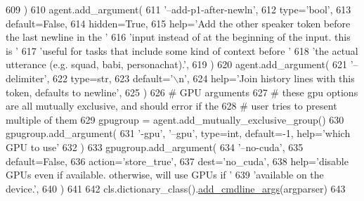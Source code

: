 \begin{DoxyCode}
609         )
610         agent.add\_argument(
611             \textcolor{stringliteral}{'--add-p1-after-newln'},
612             type=\textcolor{stringliteral}{'bool'},
613             default=\textcolor{keyword}{False},
614             hidden=\textcolor{keyword}{True},
615             help=\textcolor{stringliteral}{'Add the other speaker token before the last newline in the '}
616             \textcolor{stringliteral}{'input instead of at the beginning of the input. this is '}
617             \textcolor{stringliteral}{'useful for tasks that include some kind of context before '}
618             \textcolor{stringliteral}{'the actual utterance (e.g. squad, babi, personachat).'},
619         )
620         agent.add\_argument(
621             \textcolor{stringliteral}{'--delimiter'},
622             type=str,
623             default=\textcolor{stringliteral}{'\(\backslash\)n'},
624             help=\textcolor{stringliteral}{'Join history lines with this token, defaults to newline'},
625         )
626         \textcolor{comment}{# GPU arguments}
627         \textcolor{comment}{# these gpu options are all mutually exclusive, and should error if the}
628         \textcolor{comment}{# user tries to present multiple of them}
629         gpugroup = agent.add\_mutually\_exclusive\_group()
630         gpugroup.add\_argument(
631             \textcolor{stringliteral}{'-gpu'}, \textcolor{stringliteral}{'--gpu'}, type=int, default=-1, help=\textcolor{stringliteral}{'which GPU to use'}
632         )
633         gpugroup.add\_argument(
634             \textcolor{stringliteral}{'--no-cuda'},
635             default=\textcolor{keyword}{False},
636             action=\textcolor{stringliteral}{'store\_true'},
637             dest=\textcolor{stringliteral}{'no\_cuda'},
638             help=\textcolor{stringliteral}{'disable GPUs even if available. otherwise, will use GPUs if '}
639             \textcolor{stringliteral}{'available on the device.'},
640         )
641 
642         cls.dictionary\_class().\hyperlink{namespaceparlai_1_1agents_1_1drqa_1_1config_a62fdd5554f1da6be0cba185271058320}{add\_cmdline\_args}(argparser)
643 
\end{DoxyCode}
\mbox{\label{classparlai_1_1core_1_1torch__agent_1_1TorchAgent_a8df662b1258ec67752b4fc0ad45733f9}} 

